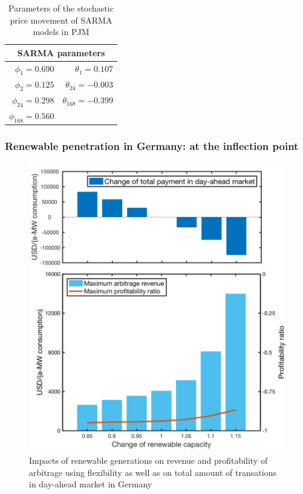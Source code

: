 \begin{table}[h!]
	\centering
	\begin{tabular}{r r}
		\hline
		\multicolumn{2}{c}{SARMA parameters}\\
		\hline
		$\phi_1 = 0.690$ & $\theta_1 = 0.107$ \\
		$\phi_2 = 0.125$ & $\theta_{24} =-0.003$ \\
		$\phi_{24} = 0.298$ & $\theta_{168} = -0.399$ \\
		$\phi_{168} = 0.560$ & \\
		\hline
	\end{tabular}
	\caption{Parameters of the stochastic price movement of SARMA models in PJM}\label{tab:SARMA_PJM}
\end{table}


\subsubsection{Renewable penetration in Germany: at the inflection point}


\begin{figure}[h!]
	\centering
	\includegraphics[width=0.95\linewidth]{Figures/RenewablePenetration_Germany}
	\caption{Impacts of renewable generations on revenue and profitability of arbitrage using flexibility as well as on total amount of transations in day-ahead market in Germany}
	\label{fig:renew_germany}
\end{figure}

